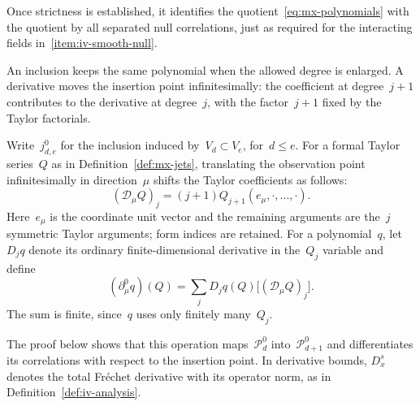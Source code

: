 Once strictness is established, it identifies the quotient~\eqref{eq:mx-polynomials} with the quotient by all separated null correlations, just as required for the interacting fields in~\ref{item:iv-smooth-null}.

An inclusion keeps the same polynomial when the allowed degree is enlarged. A derivative moves the insertion point infinitesimally: the coefficient at degree~$j+1$ contributes to the derivative at degree~$j$, with the factor~$j+1$ fixed by the Taylor factorials.

\begin{definition}\label{def:mx-operations}
Write~$j^0_{d,e}$ for the inclusion induced by~$V_d\subset V_e$, for~$d\le e$.
For a formal Taylor series~$Q$ as in Definition~\ref{def:mx-jets}, translating the observation point infinitesimally in direction~$\mu$ shifts the Taylor coefficients as follows:
\begin{equation*}
 (\mathcal D_\mu Q)_j=(j+1)Q_{j+1}(e_\mu,\cdot,\ldots,\cdot).
\end{equation*}
Here~$e_\mu$ is the coordinate unit vector and the remaining arguments are the~$j$ symmetric Taylor arguments; form indices are retained.
For a polynomial~$q$, let~$D_jq$ denote its ordinary finite-dimensional derivative in the~$Q_j$ variable and define
\begin{equation}\label{eq:mx-polynomial-derivative}
 (\partial_\mu^0q)(Q)=\sum_j D_jq(Q)\bigl[(\mathcal D_\mu Q)_j\bigr].
\end{equation}
The sum is finite, since~$q$ uses only finitely many~$Q_j$.
\end{definition}

The proof below shows that this operation maps~$\mathcal P_d^0$ into~$\mathcal P_{d+1}^0$ and differentiates its correlations with respect to the insertion point.
In derivative bounds, $D_x^s$ denotes the total Fr\'echet derivative with its operator norm, as in Definition~\ref{def:iv-analysis}.

